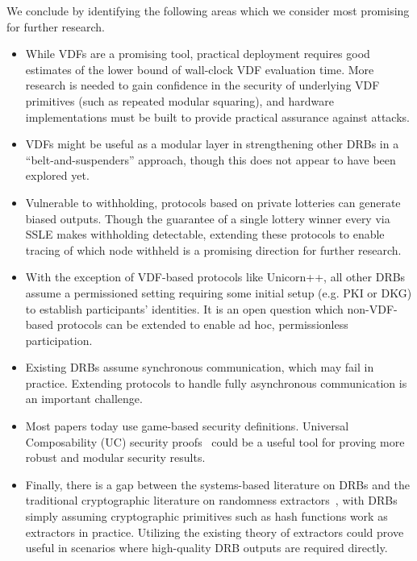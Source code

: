 We conclude by identifying the following areas which we consider most promising for further research.
\begin{itemize}
    \item While VDFs are a promising tool, practical deployment requires good estimates of the lower bound of wall-clock VDF evaluation time. More research is needed to gain confidence in the security of underlying VDF primitives (such as repeated modular squaring), and hardware implementations must be built to provide practical assurance against attacks.
    \item VDFs might be useful as a modular layer in strengthening other DRBs in a ``belt-and-suspenders'' approach, though this does not appear to have been explored yet.
    \item Vulnerable to withholding, protocols based on private lotteries can generate biased outputs. Though the guarantee of a single lottery winner every \epoch via SSLE makes withholding detectable, extending these protocols to enable tracing of which node withheld is a promising direction for further research.
    \item With the exception of VDF-based protocols like Unicorn++, all other DRBs assume a permissioned setting requiring some initial setup (e.g. PKI or DKG) to establish participants' identities. It is an open question which non-VDF-based protocols can be extended to enable ad hoc, permissionless participation.
    \item Existing DRBs assume synchronous communication, which may fail in practice. Extending protocols to handle fully asynchronous communication is an important challenge.
    \item Most papers today use game-based security definitions. Universal Composability (UC) security proofs~\cite{canetti2001universally} could be a useful tool for proving more robust and modular security results.
    \item Finally, there is a gap between the systems-based literature on DRBs and the traditional cryptographic literature on randomness extractors~\cite{trevisan2000extracting,trevisan2001extractors}, with DRBs simply assuming cryptographic primitives such as hash functions work as extractors in practice. Utilizing the existing theory of extractors could prove useful in scenarios where high-quality DRB outputs are required directly.

\end{itemize}

